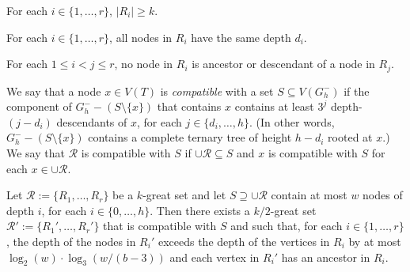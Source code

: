 \documentclass{patmorin}
\newcommand{\defin}[1]{\emph{\color{brightmaroon}#1}}
\begin{document}
\begin{compactenum}
  \item For each $i\in\{1,\ldots,r\}$, $|R_i|\ge k$.
  \item For each $i\in\{1,\ldots,r\}$, all nodes in $R_i$ have the same depth $d_i$.
  \item For each $1\le i<j\le r$, no node in $R_i$ is ancestor or descendant of a node in $R_j$.
\end{compactenum}

We say that a node $x\in V(T)$ is \defin{compatible} with a set $S\subseteq V(G_h^-)$ if the component of $G_h^--(S\setminus\{x\})$ that contains $x$ contains at least $3^j$ depth-$(j-d_i)$ descendants of $x$, for each $j\in\{d_i,\ldots,h\}$.  (In other words, $G_h^--(S\setminus\{x\})$ contains a complete ternary tree of height $h-d_i$ rooted at $x$.)  We say that $\mathcal{R}$ is compatible with $S$ if $\cup\mathcal{R}\subseteq S$ and $x$ is compatible with $S$ for each $x\in\cup\mathcal{R}$.  


\begin{lem}\label{compatible_set}
  Let $\mathcal{R}:=\{R_1,\ldots,R_r\}$ be a $k$-great set and let $S\supseteq \cup\mathcal{R}$ contain at most $w$ nodes of depth $i$, for each $i\in\{0,\ldots,h\}$.  Then there exists a $k/2$-great set $\mathcal{R}':=\{R_1',\ldots,R_r'\}$ that is compatible with $S$ and such that, for each $i\in\{1,\ldots,r\}$, the depth of the nodes in $R_i'$ exceeds the depth of the vertices in $R_i$ by at most $\log_2(w)\cdot\log_3(w/(b-3))$ and each vertex in $R_i'$ has an ancestor in $R_i$.
\end{lem}
\end{document}
